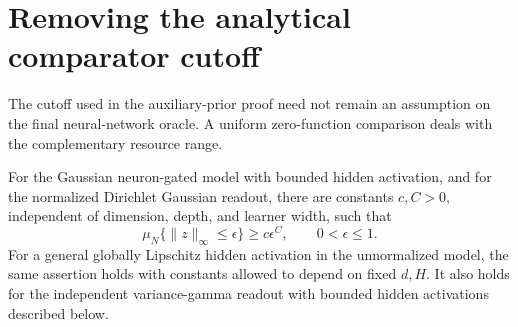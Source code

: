 \section{Removing the analytical comparator cutoff}
\label{sec:zero-comparison}
The cutoff used in the auxiliary-prior proof need not remain an
assumption on the final neural-network oracle. A uniform zero-function
comparison deals with the complementary resource range.

\begin{lemma}
\label{lem:raw-zero-smallball}
For the Gaussian neuron-gated model with bounded hidden activation,
and for the normalized Dirichlet Gaussian readout, there are constants
$c,C>0$, independent of dimension, depth, and learner width, such that
\[
 \mu_N\{\|z\|_\infty\le\epsilon\}\ge c\epsilon^C,
 \qquad0<\epsilon\le1.
\]
For a general globally Lipschitz hidden activation in the unnormalized
model, the same assertion holds with constants allowed to depend on
fixed $d,H$. It also holds for the independent variance-gamma readout
with bounded hidden activations described below.
\end{lemma}
